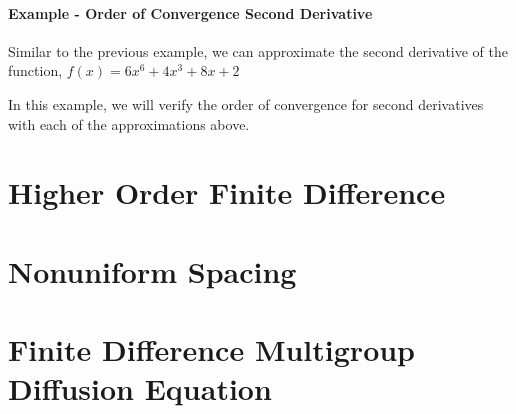 \paragraph{Example - Order of Convergence Second Derivative}

Similar to the previous example, we can approximate the second derivative of the function, $f\left(x\right) = 6x^{6} + 
4x^{3} + 8x + 2$

In this example, we will verify the order of convergence for second derivatives with each of the approximations above.
\section{Higher Order Finite Difference}

\section{Nonuniform Spacing}
\label{subsec:fdm_nonuniform}


\section{Finite Difference Multigroup Diffusion Equation}

